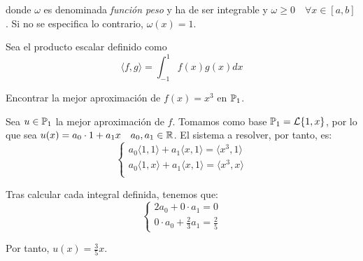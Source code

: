 donde $\omega$ es denominada \emph{función peso} y ha de ser integrable y $\omega\geq 0 \quad \forall x\in [a,b]$. Si no se especifica lo contrario, $\omega(x)=1$.

\begin{ejemplo}
    Sea el producto escalar definido como
    \begin{equation*}
        \langle f,g\rangle = \int_{-1}^1 f(x)g(x)dx
    \end{equation*}

    Encontrar la mejor aproximación de $f(x)=x^3$ en $\mathbb{P}_1$.

    Sea $u\in \mathbb{P}_1$ la mejor aproximación de $f$. Tomamos como base $\mathbb{P}_1=\mathcal{L}\{1,x\}$, por lo que sea $u(x)=a_0\cdot 1 + a_1x \quad a_0,a_1\in \mathbb{R}$. El sistema a resolver, por tanto, es:
    \begin{equation*}
        \left\{\begin{array}{c}
            a_0\langle 1,1\rangle + a_1 \langle x,1\rangle = \langle x^3, 1 \rangle \\
            a_0\langle 1,x\rangle + a_1 \langle x,1\rangle = \langle x^3, x \rangle \\
        \end{array}\right.
    \end{equation*}

    Tras calcular cada integral definida, tenemos que:
    \begin{equation*}
        \left\{\begin{array}{c}
            2a_0 + 0\cdot a_1 = 0 \\
            0\cdot a_0 + \frac{2}{3} a_1 = \frac{2}{5}
        \end{array}\right.
    \end{equation*}

    Por tanto, $u(x)=\frac{3}{5}x$.
    \begin{figure}[H]
        \centering
    \end{figure}
\end{ejemplo}


